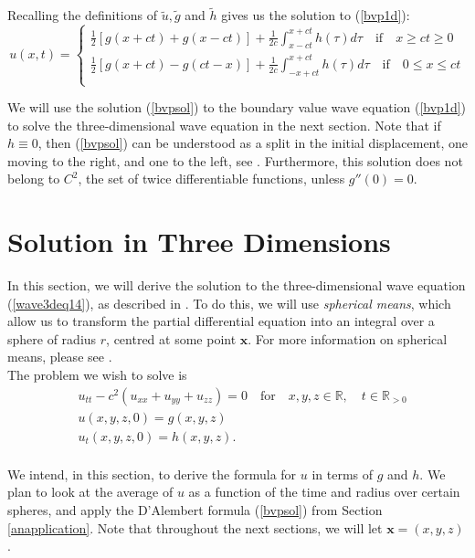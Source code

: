 \documentclass[a4paper, 12pt]{article}
\numberwithin{equation}{section}
\begin{document}
Recalling the definitions of $\tilde{u}, \tilde{g}$ and $\tilde{h}$ gives us the
solution to (\ref{bvp1d}):
\begin{equation} \label{bvpsol}
    u(x,t)=
    \begin{cases}
        \frac{1}{2}\left[g(x+ct)+g(x-ct)\right]+\frac{1}{2c}\int^{x+ct}_{x-ct}h(\tau)d\tau \quad \textrm{if} \quad x \ge ct \ge 0\\
        \frac{1}{2}\left[g(x+ct)-g(ct-x)\right]+\frac{1}{2c}\int^{x+ct}_{-x+ct}h(\tau)d\tau \quad \textrm{if} \quad 0 \le x \le ct\\
    \end{cases}
\end{equation}

We will use the solution (\ref{bvpsol}) to the boundary value wave equation
(\ref{bvp1d}) to solve the three-dimensional wave equation in the next section.
Note that if $h \equiv 0$, then (\ref{bvpsol}) can be understood as a split in
the initial displacement, one moving to the right, and one to the left, see
\cite[Ch. 2.4.1]{Ev}. Furthermore, this solution does not belong to $C^2$, the set of twice
differentiable functions, unless $g''(0)=0$.

\section{Solution in Three Dimensions} \label{sec3d}
In this section, we will derive the solution to the three-dimensional wave
equation (\ref{wave3deq14}), as described in \cite[Chap. 2.4]{Ev}. To do this,
we will use \emph{spherical means}, which allow us to transform the partial
differential equation into an integral over a sphere of radius $r$, centred at
some point $\boldsymbol{x}$. For more information on spherical means, please
see \cite{Sab}.
\\

The problem we wish to solve is
\begin{equation} \label{3deq}
\begin{aligned}
    &u_{tt}-c^2(u_{xx}+u_{yy}+u_{zz})=0 \quad \textrm {for} \quad x, y, z \in \mathbb{R}, \quad t \in \mathbb{R}_{>0}\\
    &u(x, y, z,0)=g(x,y,z)\\
    &u_t(x,y,z,0)=h(x,y,z).\\
\end{aligned}
\end{equation}

We intend, in this section, to derive the formula for $u$ in terms of $g$ and
$h$. We plan to look at the average of $u$ as a function of the time and radius
over certain spheres, and apply the D'Alembert formula (\ref{bvpsol}) from
Section \ref{anapplication}. Note that throughout the next sections, we will let
$\boldsymbol{x}=(x,y,z)$.
\end{document}

